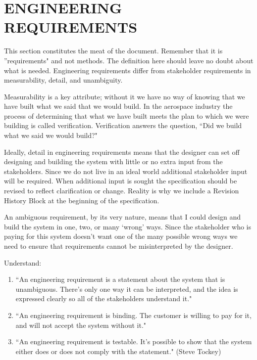 \section{ENGINEERING REQUIREMENTS}

\begin{slshape} 
\color{blue}
	This section constitutes the meat of the document. Remember that it is ''requirements" and not methods. The 
	definition here should leave no doubt about what is needed.  Engineering requirements differ from stakeholder requirements in measurability, detail, and unambiguity.
	\bigskip
	
	Measurability is a key attribute; without it we have no way of knowing that we have built what we said that we would build.  In the aerospace industry 
	the process of determining that what we have built meets the plan to which we were building is called verification.  Verification answers the question,
	``Did we build what we said we would build?"
	\bigskip
	
	Ideally, detail in engineering requirements means that the designer can set off designing and building the system with little or no extra input from the stakeholders.  
	Since we do not live in an ideal world additional stakeholder input will be required.  When additional input is sought the specification should be revised to reflect clarification
	or change.  Reality is why we include a Revision History Block at the beginning of the specification.
	\bigskip
	
	An ambiguous requirement, by its very nature, means that I could design and build the system in one, two, or many `wrong' ways.  Since the stakeholder who is paying for this system doesn't want one of the many possible wrong ways we need to ensure that requirements cannot be misinterpreted by the designer. 
 \bigskip
	
	
	
	Understand:
		\begin{enumerate}
			\item ``An engineering requirement is a statement about the system that is unambiguous. There's only one way it can be interpreted, 
							and the idea is expressed clearly so all of the stakeholders understand it."
			\item ``An engineering requirement is binding. The customer is willing to pay for it, and will not accept the system without it."
			\item	``An engineering requirement is testable. It's possible to show that the system either does or does not comply with the statement." (Steve Tockey)
		\end{enumerate}
		

\end{slshape}
